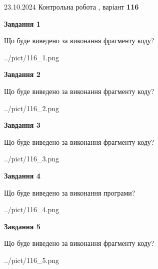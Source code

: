 \documentclass[12pt, ukrainian]{article}
\begin{document}
{\Large{23.10.2024 Контрольна робота , варіант  \No \textbf { 116 }\par}}
{
\begin {large}
{\begin {center}\textbf{Завдання 1}\end {center}}

Що буде виведено за виконання фрагменту коду?\par
\begin{center}
	{../pict/116_1.png}
\end{center}
\newpage

{\begin {center}\textbf{Завдання 2}\end {center}}

Що буде виведено за виконання фрагменту коду?\par
\begin{center}
	{../pict/116_2.png}
\end{center}
\newpage

{\begin {center}\textbf{Завдання 3}\end {center}}

Що буде виведено за виконання фрагменту коду?\par
\begin{center}
	{../pict/116_3.png}
\end{center}
\newpage

{\begin {center}\textbf{Завдання 4}\end {center}}

Що буде виведено за виконання програми?\par
\begin{center}
	{../pict/116_4.png}
\end{center}
\newpage

{\begin {center}\textbf{Завдання 5}\end {center}}

Що буде виведено за виконання фрагменту коду?\par
\begin{center}
	{../pict/116_5.png}
\end{center}
\newpage


\end{large}}
\end{document}
